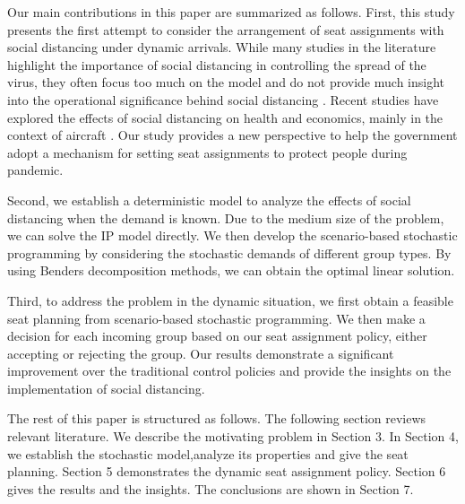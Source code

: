 Our main contributions in this paper are summarized as follows. First, this study presents the first attempt to consider the arrangement of seat assignments with social distancing under dynamic arrivals. While many studies in the literature highlight the importance of social distancing in controlling the spread of the virus, they often focus too much on the model and do not provide much insight into the operational significance behind social distancing \cite{barry2021optimal, fischetti2021safe}. Recent studies have explored the effects of social distancing on health and economics, mainly in the context of aircraft \cite{salari2020social, ghorbani2020model, salari2022social}. Our study provides a new perspective to help the government adopt a mechanism for setting seat assignments to protect people during pandemic.

Second, we establish a deterministic model to analyze the effects of social distancing when the demand is known. Due to the medium size of the problem, we can solve the IP model directly. We then develop the scenario-based stochastic programming by considering the stochastic demands of different group types. By using Benders decomposition methods, we can obtain the optimal linear solution. 

Third, to address the problem in the dynamic situation, we first obtain a feasible seat planning from scenario-based stochastic programming. We then make a decision for each incoming group based on our seat assignment policy, either accepting or rejecting the group. Our results demonstrate a significant improvement over the traditional control policies and provide the insights on the implementation of social distancing.



The rest of this paper is structured as follows. The following section reviews relevant literature. We describe the motivating problem in Section 3. In Section 4, we establish the stochastic model,analyze its properties and give the seat planning. Section 5 demonstrates the dynamic seat assignment policy. Section 6 gives the results and the insights. The conclusions are shown in Section 7.
\newpage
